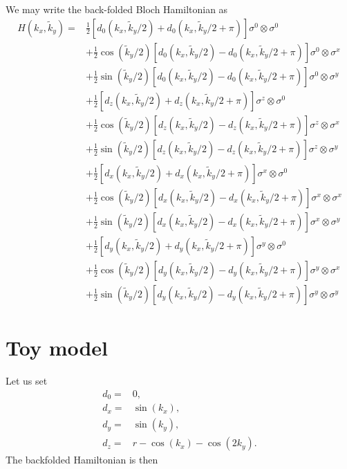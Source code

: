 \documentclass[english]{scrartcl}
\begin{document}
We may write the back-folded Bloch Hamiltonian as 
\begin{align*}
H(k_x, \tilde k_y) =& \frac{1}{2} [d_0(k_x, \tilde k_y / 2) + d_0(k_x, \tilde k_y / 2 + \pi) ] \sigma^0 \otimes \sigma^0 \\
& + \frac{1}{2}  \cos(\tilde k_y /2) [d_0(k_x, \tilde k_y / 2) - d_0(k_x, \tilde k_y / 2 + \pi) ] \sigma^0 \otimes \sigma^x \\
& + \frac{1}{2}  \sin(\tilde k_y /2) [d_0(k_x, \tilde k_y / 2) - d_0(k_x, \tilde k_y / 2 + \pi) ] \sigma^0 \otimes \sigma^y \\
&+  \frac{1}{2} [d_z(k_x, \tilde k_y / 2) + d_z(k_x, \tilde k_y / 2 + \pi) ] \sigma^z \otimes \sigma^0 \\
& + \frac{1}{2}  \cos(\tilde k_y /2) [d_z(k_x, \tilde k_y / 2) - d_z(k_x, \tilde k_y / 2 + \pi) ] \sigma^z \otimes \sigma^x \\
& + \frac{1}{2}  \sin(\tilde k_y /2) [d_z(k_x, \tilde k_y / 2) - d_z(k_x, \tilde k_y / 2 + \pi) ] \sigma^z \otimes \sigma^y \\
&+  \frac{1}{2} [d_x(k_x, \tilde k_y / 2) + d_x(k_x, \tilde k_y / 2 + \pi) ] \sigma^x \otimes \sigma^0 \\
&+ \frac{1}{2}  \cos(\tilde k_y /2) [d_x(k_x, \tilde k_y / 2) - d_x(k_x, \tilde k_y / 2 + \pi) ] \sigma^x \otimes \sigma^x \\
&+ \frac{1}{2}  \sin(\tilde k_y /2) [d_x(k_x, \tilde k_y / 2) - d_x(k_x, \tilde k_y / 2 + \pi) ] \sigma^x \otimes \sigma^y \\
&+  \frac{1}{2} [d_y(k_x, \tilde k_y / 2) + d_y(k_x, \tilde k_y / 2 + \pi) ] \sigma^y \otimes \sigma^0 \\
& + \frac{1}{2}  \cos(\tilde k_y /2) [d_y(k_x, \tilde k_y / 2) - d_y(k_x, \tilde k_y / 2 + \pi) ] \sigma^y \otimes \sigma^x\\
& + \frac{1}{2}  \sin(\tilde k_y /2) [d_y(k_x, \tilde k_y / 2) - d_y(k_x, \tilde k_y / 2 + \pi) ] \sigma^y \otimes \sigma^y
\end{align*}


\section{Toy model}
Let us set
\begin{align*}
d_0 =& 0, \\
d_x =& \sin(k_x), \\
d_y =& \sin(k_y), \\
d_z =& r - \cos(k_x) - \cos(2 k_y).
\end{align*}
The backfolded Hamiltonian is then
\end{document}
